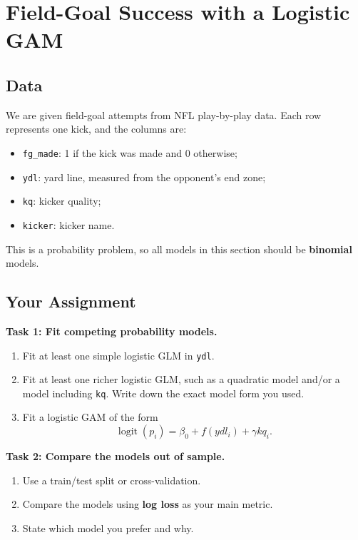 \documentclass[twoside]{article}
\theoremstyle{definition}
\newcommand{\logit}{\operatorname{logit}}
\begin{document}
\color{black}

\section{Field-Goal Success with a Logistic GAM}

\subsection{Data}

We are given field-goal attempts from NFL play-by-play data. Each row represents one kick, and the columns are:
\begin{itemize}
    \item[-] \texttt{fg\_made}: 1 if the kick was made and 0 otherwise;
    \item[-] \texttt{ydl}: yard line, measured from the opponent's end zone;
    \item[-] \texttt{kq}: kicker quality;
    \item[-] \texttt{kicker}: kicker name.
\end{itemize}

This is a probability problem, so all models in this section should be \textbf{binomial} models.

\color{blue}
\subsection{Your Assignment}

\textbf{Task 1: Fit competing probability models.}
\begin{enumerate}
    \item[-] Fit at least one simple logistic GLM in \texttt{ydl}.
    \item[-] Fit at least one richer logistic GLM, such as a quadratic model and/or a model including \texttt{kq}. Write down the exact model form you used.
    \item[-] Fit a logistic GAM of the form
    \[
        \logit(p_i) = \beta_0 + f(ydl_i) + \gamma kq_i.
    \]
\end{enumerate}

\textbf{Task 2: Compare the models out of sample.}
\begin{enumerate}
    \item[-] Use a train/test split or cross-validation.
    \item[-] Compare the models using \textbf{log loss} as your main metric.
    \item[-] State which model you prefer and why.
\end{enumerate}
\end{document}
